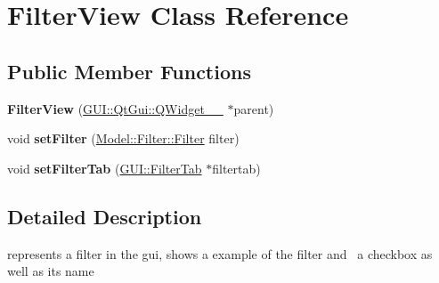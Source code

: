\hypertarget{classGUI_1_1FilterView}{}\section{Filter\+View Class Reference}
\label{classGUI_1_1FilterView}
\subsection*{Public Member Functions}
\begin{DoxyCompactItemize}
\item 
\hypertarget{classGUI_1_1FilterView_aa31e034ecd1383cc8b2f35285f208764}{}{\bfseries Filter\+View} (\hyperlink{classGUI_1_1QtGui_1_1QWidget____10}{G\+U\+I\+::\+Qt\+Gui\+::\+Q\+Widget\+\_\+\+\_} $\ast$parent)\label{classGUI_1_1FilterView_aa31e034ecd1383cc8b2f35285f208764}

\item 
\hypertarget{classGUI_1_1FilterView_a5b70d646670fa62496626d2a3248598c}{}void {\bfseries set\+Filter} (\hyperlink{classModel_1_1Filter_1_1Filter}{Model\+::\+Filter\+::\+Filter} filter)\label{classGUI_1_1FilterView_a5b70d646670fa62496626d2a3248598c}

\item 
\hypertarget{classGUI_1_1FilterView_a8732f98917f4cf76c86e9c4d6df1ce70}{}void {\bfseries set\+Filter\+Tab} (\hyperlink{classGUI_1_1FilterTab}{G\+U\+I\+::\+Filter\+Tab} $\ast$filtertab)\label{classGUI_1_1FilterView_a8732f98917f4cf76c86e9c4d6df1ce70}

\end{DoxyCompactItemize}


\subsection{Detailed Description}
represents a filter in the gui, shows a example of the filter and  a checkbox as well as its name 